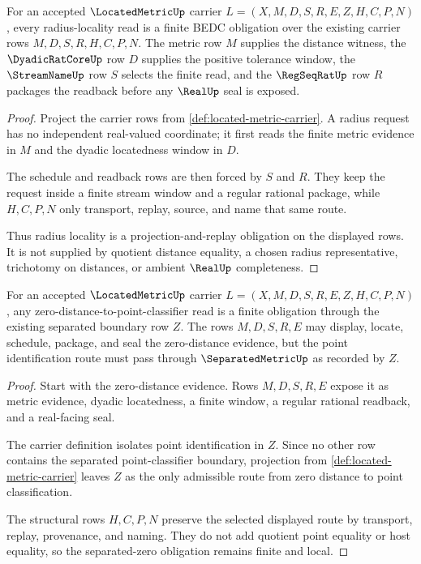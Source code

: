 \begin{theorem}
\label{thm:locatedmetric-radius-locality-obligation}
For an accepted $\LocatedMetricUp$ carrier $L=(X,M,D,S,R,E,Z,H,C,P,N)$, every radius-locality read is a finite BEDC obligation over the existing carrier rows $M,D,S,R,H,C,P,N$. The metric row $M$ supplies the distance witness, the $\DyadicRatCoreUp$ row $D$ supplies the positive tolerance window, the $\StreamNameUp$ row $S$ selects the finite read, and the $\RegSeqRatUp$ row $R$ packages the readback before any $\RealUp$ seal is exposed.
\end{theorem}
\begin{proof}
Project the carrier rows from \autoref{def:located-metric-carrier}. A radius request has no independent real-valued coordinate; it first reads the finite metric evidence in $M$ and the dyadic locatedness window in $D$.

The schedule and readback rows are then forced by $S$ and $R$. They keep the request inside a finite stream window and a regular rational package, while $H,C,P,N$ only transport, replay, source, and name that same route.

Thus radius locality is a projection-and-replay obligation on the displayed rows. It is not supplied by quotient distance equality, a chosen radius representative, trichotomy on distances, or ambient $\RealUp$ completeness.
\end{proof}

\begin{theorem}
\label{thm:locatedmetric-separated-zero-obligation}
For an accepted $\LocatedMetricUp$ carrier $L=(X,M,D,S,R,E,Z,H,C,P,N)$, any zero-distance-to-point-classifier read is a finite obligation through the existing separated boundary row $Z$. The rows $M,D,S,R,E$ may display, locate, schedule, package, and seal the zero-distance evidence, but the point identification route must pass through $\SeparatedMetricUp$ as recorded by $Z$.
\end{theorem}
\begin{proof}
Start with the zero-distance evidence. Rows $M,D,S,R,E$ expose it as metric evidence, dyadic locatedness, a finite window, a regular rational readback, and a real-facing seal.

The carrier definition isolates point identification in $Z$. Since no other row contains the separated point-classifier boundary, projection from \autoref{def:located-metric-carrier} leaves $Z$ as the only admissible route from zero distance to point classification.

The structural rows $H,C,P,N$ preserve the selected displayed route by transport, replay, provenance, and naming. They do not add quotient point equality or host equality, so the separated-zero obligation remains finite and local.
\end{proof}

